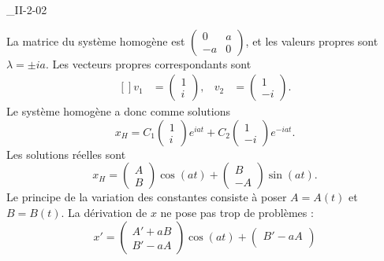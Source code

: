 

\begin{corrige}{_II-2-02}

La matrice du système homogène est $\begin{pmatrix}
	0	&	a	\\ 
	-a	&	0	
\end{pmatrix}$, et les valeurs propres sont $\lambda=\pm ia$. Les vecteurs propres correspondants sont 
\begin{equation}
	\begin{aligned}[]
		v_1&=\begin{pmatrix}
	1	\\ 
	i	
\end{pmatrix},&v_2&=\begin{pmatrix}
	1	\\ 
	-i	
\end{pmatrix}.
	\end{aligned}
\end{equation}
Le système homogène a donc comme solutions
\begin{equation}
	x_H=C_1\begin{pmatrix}
	1	\\ 
	i	
\end{pmatrix} e^{iat}+C_2\begin{pmatrix}
	1	\\ 
	-i	
\end{pmatrix} e^{-iat}.
\end{equation}
Les solutions réelles sont 
\begin{equation}
	x_H=\begin{pmatrix}
	A	\\ 
	B	
\end{pmatrix}\cos(at)+\begin{pmatrix}
	B	\\ 
	-A	
\end{pmatrix}\sin(at).
\end{equation}
Le principe de la variation des constantes consiste à poser $A=A(t)$ et $B=B(t)$. La dérivation de $x$ ne pose pas trop de problèmes :
\begin{equation}
	x'=\begin{pmatrix}
	A'+aB	\\ 
	B'-aA	
\end{pmatrix}\cos(at)+\begin{pmatrix}
	B'-aA	\\ 

\end{pmatrix}
\end{equation}
\end{corrige}
